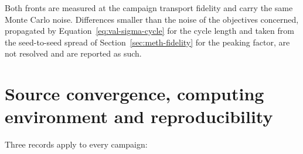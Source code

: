 Both fronts are measured at the campaign transport fidelity and carry
the same Monte Carlo noise. Differences smaller than the noise of the
objectives concerned, propagated by
Equation~\eqref{eq:val-sigma-cycle} for the cycle length and taken from
the seed-to-seed spread of Section~\ref{sec:meth-fidelity} for the
peaking factor, are not resolved and are reported as such.


\label{sec:meth-limits}\label{sec:meth-limits-consequence}\label{tab:limits-summary}\label{sec:meth-limits-secant}\label{eq:secant}\label{eq:local-derivative}\label{eq:boron-chord}\label{eq:cbol-root}\label{sec:meth-limits-state}\label{eq:margin-peak}\label{sec:meth-limits-sigma}\label{eq:slope-sigma}\label{eq:nsigma}

\section{Source convergence, computing environment and reproducibility}
\label{sec:meth-diagnostics}

Three records apply to every campaign:

